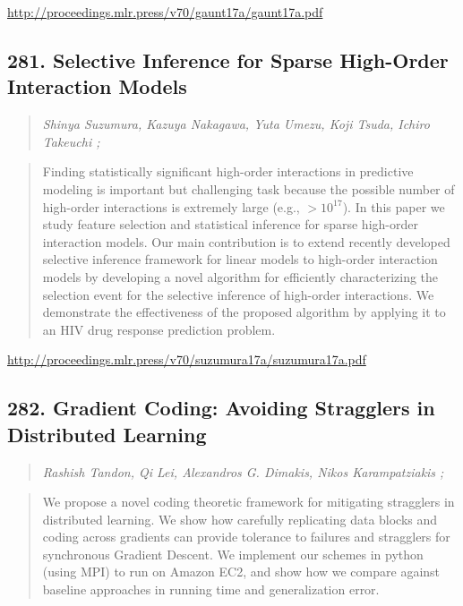 \documentclass{article}
\begin{document}
\href{http://proceedings.mlr.press/v70/gaunt17a/gaunt17a.pdf}{http://proceedings.mlr.press/v70/gaunt17a/gaunt17a.pdf}

\subsection{281. Selective Inference for Sparse High-Order Interaction Models}

\begin{quote}
\footnotesize{\textit{Shinya Suzumura, Kazuya Nakagawa, Yuta Umezu, Koji Tsuda, Ichiro Takeuchi ;}}

\end{quote}

\begin{quote}
    Finding statistically significant high-order interactions in predictive modeling is important but challenging task because the possible number of high-order interactions is extremely large (e.g., $> 10^{17}$). In this paper we study feature selection and statistical inference for sparse high-order interaction models. Our main contribution is to extend recently developed selective inference framework for linear models to high-order interaction models by developing a novel algorithm for efficiently characterizing the selection event for the selective inference of high-order interactions. We demonstrate the effectiveness of the proposed algorithm by applying it to an HIV drug response prediction problem.  
\end{quote}

\href{http://proceedings.mlr.press/v70/suzumura17a/suzumura17a.pdf}{http://proceedings.mlr.press/v70/suzumura17a/suzumura17a.pdf}

\subsection{282. Gradient Coding: Avoiding Stragglers in Distributed Learning}

\begin{quote}
\footnotesize{\textit{Rashish Tandon, Qi Lei, Alexandros G. Dimakis, Nikos Karampatziakis ;}}

\end{quote}

\begin{quote}
    We propose a novel coding theoretic framework for mitigating stragglers in distributed learning. We show how carefully replicating data blocks and coding across gradients can provide tolerance to failures and stragglers for synchronous Gradient Descent. We implement our schemes in python (using MPI) to run on Amazon EC2, and show how we compare against baseline approaches in running time and generalization error.  
\end{quote}
\end{document}
